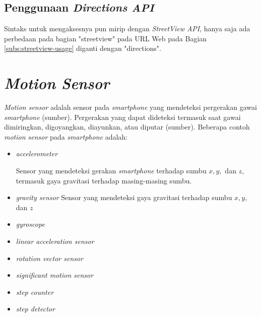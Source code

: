 \subsection{Penggunaan {\it Directions API}}
Sintaks untuk mengaksesnya pun mirip dengan \textit{StreetView API}, hanya saja ada perbedaan pada bagian "streetview" pada URL Web pada Bagian \ref{subs:streetview-usage} diganti dengan "directions". 




\section{\textit{Motion Sensor}}
\label{subs:motion-sensor}
\textit{Motion sensor} adalah sensor pada \textit{smartphone} yang mendeteksi pergerakan gawai \textit{smartphone} (sumber). Pergerakan yang dapat dideteksi termasuk saat gawai dimiringkan, digoyangkan, diayunkan, atau diputar (sumber). Beberapa contoh \textit{motion sensor} pada \textit{smartphone} adalah:
\begin{itemize}
	\item \textit{accelerometer}
	
	Sensor yang mendeteksi gerakan \textit{smartphone} terhadap sumbu $x, y,$ dan $z$, termasuk gaya gravitasi terhadap masing-masing sumbu.
	\item \textit{gravity sensor}
	Sensor yang mendeteksi gaya gravitasi terhadap sumbu $x, y,$ dan $z$
	\item \textit{gyroscope}
	
	\item \textit{linear acceleration sensor}
	\item \textit{rotation vector sensor}
	\item \textit{significant motion sensor}
	\item \textit{step counter}
	\item \textit{step detector}
\end{itemize}

